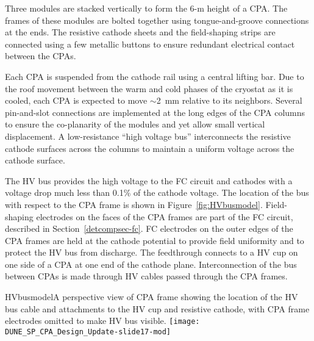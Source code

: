 Three modules are stacked vertically to form the 6-m height of a CPA. %
The frames of these modules are bolted together using tongue-and-groove connections at the ends. The resistive cathode sheets and the field-shaping strips are connected using a few metallic buttons to ensure redundant electrical contact between the CPAs. %

Each CPA is suspended from the cathode rail using a central lifting bar.  Due to the roof movement between the warm and cold phases of the cryostat as it is cooled, each CPA is expected to move $\sim$2~mm relative to its neighbors.  Several pin-and-slot connections are implemented at the long edges of the CPA columns to ensure the co-planarity of the modules and yet allow small vertical displacement.  A low-resistance
``high voltage bus''  interconnects the resistive cathode surfaces across the columns to maintain a uniform voltage across the cathode surface.

The HV bus provides the high voltage to the FC
circuit and cathodes with a voltage drop much less than 0.1\% of the
cathode voltage. The location of the bus with respect to the CPA frame is shown in Figure~\ref{fig:HVbusmodel}. Field-shaping electrodes on the faces of the CPA
frames  are part of the FC circuit, described in Section~\ref{detcompsec-fc}. 
FC electrodes on the outer edges of the
CPA frames  are held at the cathode potential to provide field
uniformity and to protect the HV bus from discharge.  The feedthrough
connects to a HV cup on one side of a CPA at one end of
the cathode plane.  Interconnection of the bus between CPAs is made
through HV cables passed through the CPA frames. 

\begin{cdrfigure}{HVbusmodel}{A perspective view of CPA frame showing the location of the HV bus cable and attachments to the HV cup and resistive cathode, with CPA frame electrodes omitted to make HV bus visible.}
\texttt{[image: DUNE\_SP\_CPA\_Design\_Update-slide17-mod]}
\end{cdrfigure}


